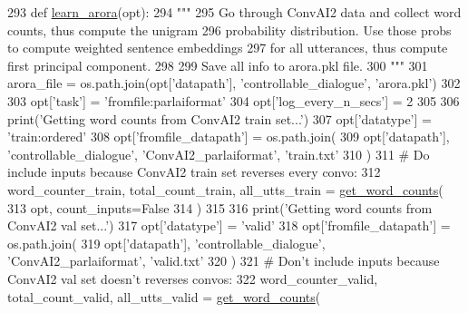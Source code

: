 \begin{DoxyCode}
293 \textcolor{keyword}{def }\hyperlink{namespaceprojects_1_1controllable__dialogue_1_1controllable__seq2seq_1_1arora_a4fba2bc46a41b5255407e76ca52e0398}{learn\_arora}(opt):
294     \textcolor{stringliteral}{"""}
295 \textcolor{stringliteral}{    Go through ConvAI2 data and collect word counts, thus compute the unigram}
296 \textcolor{stringliteral}{    probability distribution. Use those probs to compute weighted sentence embeddings}
297 \textcolor{stringliteral}{    for all utterances, thus compute first principal component.}
298 \textcolor{stringliteral}{}
299 \textcolor{stringliteral}{    Save all info to arora.pkl file.}
300 \textcolor{stringliteral}{    """}
301     arora\_file = os.path.join(opt[\textcolor{stringliteral}{'datapath'}], \textcolor{stringliteral}{'controllable\_dialogue'}, \textcolor{stringliteral}{'arora.pkl'})
302 
303     opt[\textcolor{stringliteral}{'task'}] = \textcolor{stringliteral}{'fromfile:parlaiformat'}
304     opt[\textcolor{stringliteral}{'log\_every\_n\_secs'}] = 2
305 
306     print(\textcolor{stringliteral}{'Getting word counts from ConvAI2 train set...'})
307     opt[\textcolor{stringliteral}{'datatype'}] = \textcolor{stringliteral}{'train:ordered'}
308     opt[\textcolor{stringliteral}{'fromfile\_datapath'}] = os.path.join(
309         opt[\textcolor{stringliteral}{'datapath'}], \textcolor{stringliteral}{'controllable\_dialogue'}, \textcolor{stringliteral}{'ConvAI2\_parlaiformat'}, \textcolor{stringliteral}{'train.txt'}
310     )
311     \textcolor{comment}{# Do include inputs because ConvAI2 train set reverses every convo:}
312     word\_counter\_train, total\_count\_train, all\_utts\_train = \hyperlink{namespaceprojects_1_1controllable__dialogue_1_1controllable__seq2seq_1_1arora_a2a5256a5d5666134bc2a89b0fe831fcd}{get\_word\_counts}(
313         opt, count\_inputs=\textcolor{keyword}{False}
314     )
315 
316     print(\textcolor{stringliteral}{'Getting word counts from ConvAI2 val set...'})
317     opt[\textcolor{stringliteral}{'datatype'}] = \textcolor{stringliteral}{'valid'}
318     opt[\textcolor{stringliteral}{'fromfile\_datapath'}] = os.path.join(
319         opt[\textcolor{stringliteral}{'datapath'}], \textcolor{stringliteral}{'controllable\_dialogue'}, \textcolor{stringliteral}{'ConvAI2\_parlaiformat'}, \textcolor{stringliteral}{'valid.txt'}
320     )
321     \textcolor{comment}{# Don't include inputs because ConvAI2 val set doesn't reverses convos:}
322     word\_counter\_valid, total\_count\_valid, all\_utts\_valid = \hyperlink{namespaceprojects_1_1controllable__dialogue_1_1controllable__seq2seq_1_1arora_a2a5256a5d5666134bc2a89b0fe831fcd}{get\_word\_counts}(

\end{DoxyCode}
